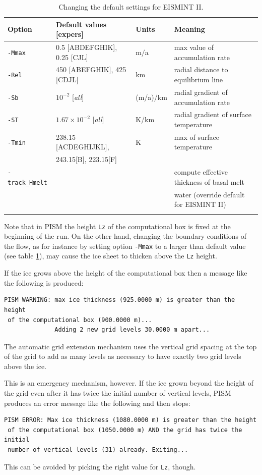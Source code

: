 \documentclass[11pt,final]{amsart}
\begin{document}
\begin{table}[ht]
\caption{Changing the default settings for EISMINT II.}\label{tab:eisIIoptions}
\small
\begin{tabular}{@{}llll}\hline
\textbf{Option} & \textbf{Default values [expers]} & \textbf{Units} & \textbf{Meaning} \\ \hline
\verb|-Mmax| & 0.5 [ABDEFGHIK], 0.25 [CJL] & m$/$a & max value of accumulation rate \\
\verb|-Rel| & 450 [ABEFGHIK], 425 [CDJL] & km & radial distance to equilibrium line \\
\verb|-Sb| & $10^{-2}$ [\emph{all}] & (m/a)/km & radial gradient of accumulation rate \\
\verb|-ST| & $1.67 \times 10^{-2}$ [\emph{all}] & K/km & radial gradient of surface temperature\\
\verb|-Tmin| & 238.15 [ACDEGHIJKL], & K & max of surface temperature \\
 & 243.15[B], 223.15[F] & & \\
\verb|-track_Hmelt| &  &  & compute effective thickness of basal melt \\
 &  &  & water (override default for EISMINT II) \\
\hline\normalsize
\end{tabular}\end{table}

Note that in PISM the height \verb|Lz| of the computational box is fixed at the beginning of the run.  On the other hand, changing the boundary conditions of the flow, as for instance by setting option \verb|-Mmax| to a larger than default value (see table \ref{tab:eisIIoptions}), may cause the ice sheet to thicken above the \verb|Lz| height.

If the ice grows above the height of the computational box then a message like the following is produced:
\begin{verbatim}
PISM WARNING: max ice thickness (925.0000 m) is greater than the height
 of the computational box (900.0000 m)...
              Adding 2 new grid levels 30.0000 m apart...
\end{verbatim}
The automatic grid extension mechanism uses the vertical grid spacing at the top of the grid to add as many levels as necessary to have exactly two grid levels above the ice.

This is an emergency mechanism, however. If the ice grown beyond the height of the grid even after it has twice the initial number of vertical levels, PISM produces an error message like the following and then stops:
\begin{verbatim}
PISM ERROR: Max ice thickness (1080.0000 m) is greater than the height
 of the computational box (1050.0000 m) AND the grid has twice the initial
 number of vertical levels (31) already. Exiting...
\end{verbatim}
This can be avoided by picking the right value for \verb|Lz|, though.
\end{document}
